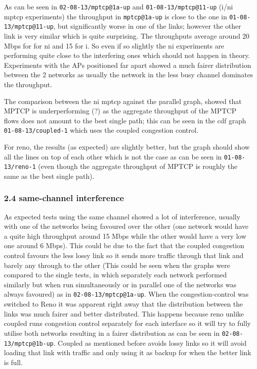 \documentclass[12pt,a4paper]{article}
\begin{document}
As can be seen in \texttt{02-08-13/mptcp@1a-up} and
\texttt{01-08-13/mptcp@11-up} (i/ni mptcp experiments) the throughput in
\texttt{mptcp@1a-up} is close to the one in \texttt{01-08-13/mptcp@11-up}, but
significantly worse in one of the links; however the other link is very similar
which is quite surprising. The throughputs average around 20 Mbps for for ni and
15 for i. So even if so slightly the ni experiments are performing quite close
to the interfering ones which should not happen in theory. Experiments with the
APs positioned far apart showed a much fairer distribution between the 2
networks as usually the network in the less busy channel dominates the
throughput.

The comparison between the ni mptcp against the parallel graph, showed that
MPTCP is underperforming (?) as the aggregate throughput of the MPTCP flows does
not amount to the best single path; this can be seen in the cdf graph
\texttt{01-08-13/coupled-1} which uses the coupled congestion control.

For reno, the results (as expected) are slightly better, but the graph should
show all the lines on top of each other which is not the case as can be seen in
\texttt{01-08-13/reno-1} (even though the aggregate throughput of MPTCP is
roughly the same as the best single path).

\subsubsection{2.4 same-channel interference}
As expected tests using the same channel showed a lot of interference, usually
with one of the networks being favoured over the other (one network would have a
quite high throughput around 15 Mbps while the other would have a very low one
around 6 Mbps). This could be due to the fact that the coupled congestion
control favours the less lossy link so it sends more traffic through that link
and barely any through to the other (This could be seen when the graphs were
compared to the single tests, in which separately each network performed
similarly but when run simultaneously or in parallel one of the networks was
always favoured) as in \texttt{02-08-13/mptcp@1a-up}. When the
congestion-control was switched to Reno it was apparent right away that the
distribution between the links was much fairer and better distributed. This
happens because reno unlike coupled runs congestion control separately for each
interface so it will try to fully utilise both networks resulting in a fairer
distribution as can be seen in \texttt{02-08-13/mptcp@1b-up}. Coupled as
mentioned before avoids lossy links so it will avoid loading that link with
traffic and only using it as backup for when the better link is full.
\end{document}
